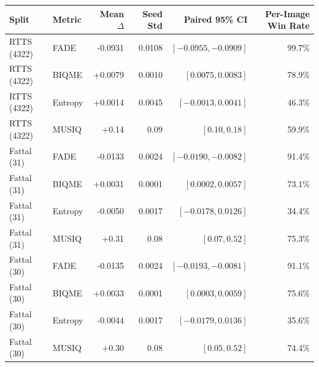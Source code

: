 \begin{tabular*}{\textwidth}{@{\extracolsep{\fill}}llrrrr@{}}\toprule
Split & Metric & Mean $\Delta$ & Seed Std & Paired 95\% CI & Per-Image Win Rate \\\midrule
RTTS (4322) & FADE & -0.0931 & 0.0108 & $[-0.0955,-0.0909]$ & 99.7\% \\
RTTS (4322) & BIQME & +0.0079 & 0.0010 & $[0.0075,0.0083]$ & 78.9\% \\
RTTS (4322) & Entropy & +0.0014 & 0.0045 & $[-0.0013,0.0041]$ & 46.3\% \\
RTTS (4322) & MUSIQ & +0.14 & 0.09 & $[0.10,0.18]$ & 59.9\% \\
Fattal (31) & FADE & -0.0133 & 0.0024 & $[-0.0190,-0.0082]$ & 91.4\% \\
Fattal (31) & BIQME & +0.0031 & 0.0001 & $[0.0002,0.0057]$ & 73.1\% \\
Fattal (31) & Entropy & -0.0050 & 0.0017 & $[-0.0178,0.0126]$ & 34.4\% \\
Fattal (31) & MUSIQ & +0.31 & 0.08 & $[0.07,0.52]$ & 75.3\% \\
Fattal (30) & FADE & -0.0135 & 0.0024 & $[-0.0193,-0.0081]$ & 91.1\% \\
Fattal (30) & BIQME & +0.0033 & 0.0001 & $[0.0003,0.0059]$ & 75.6\% \\
Fattal (30) & Entropy & -0.0044 & 0.0017 & $[-0.0179,0.0136]$ & 35.6\% \\
Fattal (30) & MUSIQ & +0.30 & 0.08 & $[0.05,0.52]$ & 74.4\% \\
\bottomrule\end{tabular*}
